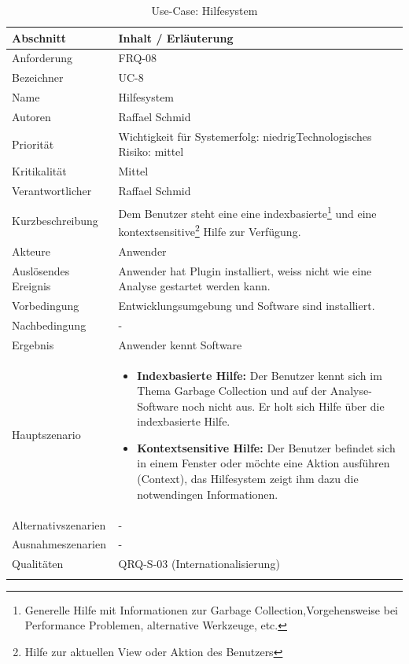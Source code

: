 \begin{longtable}{|p{4cm}|p{10.5cm}|}
\hline
   \textbf{Abschnitt} & \textbf{Inhalt / Erläuterung} \\\hline
   Anforderung & FRQ-08\\\hline
   Bezeichner & UC-8\\\hline
   Name & Hilfesystem\\\hline
   Autoren & Raffael Schmid\\\hline
   Priorität & Wichtigkeit für Systemerfolg: niedrig\newline Technologisches Risiko: mittel\\\hline
   Kritikalität & Mittel\\\hline
   Verantwortlicher & Raffael Schmid\\\hline
   Kurzbeschreibung & Dem Benutzer steht eine eine indexbasierte\footnote{Generelle Hilfe mit Informationen zur Garbage Collection,Vorgehensweise bei Performance Problemen, alternative Werkzeuge, etc.} und eine kontextsensitive\footnote{Hilfe zur aktuellen View oder Aktion des Benutzers} Hilfe zur Verfügung. \\\hline
   Akteure & Anwender\\\hline
   Auslösendes Ereignis & Anwender hat Plugin installiert, weiss nicht wie eine Analyse gestartet werden kann.\\\hline
   Vorbedingung & Entwicklungsumgebung und Software sind installiert.\\\hline
   Nachbedingung & -\\\hline
   Ergebnis & Anwender kennt Software\\\hline
   Hauptszenario &	\begin{itemize}
		\item \textbf{Indexbasierte Hilfe: } Der Benutzer kennt sich im Thema Garbage Collection und auf der Analyse-Software noch nicht aus. Er holt sich Hilfe über die indexbasierte Hilfe. 
		\item \textbf{Kontextsensitive Hilfe: } Der Benutzer befindet sich in einem Fenster oder möchte eine Aktion ausführen (Context), das Hilfesystem zeigt ihm dazu die notwendingen Informationen.
	\end{itemize}
	\\\hline
   Alternativszenarien & -\\\hline
   Ausnahmeszenarien & -\\\hline
   Qualitäten & QRQ-S-03 (Internationalisierung)\\\hline
\caption{Use-Case: Hilfesystem}
\end{longtable}

